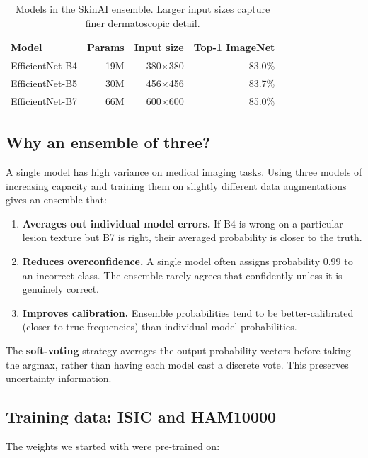 \documentclass[12pt,a4paper]{article}
\begin{document}
\begin{table}[h]
\centering
\begin{tabular}{lrrr}
\toprule
\textbf{Model} & \textbf{Params} & \textbf{Input size} & \textbf{Top-1 ImageNet} \\
\midrule
EfficientNet-B4 & 19M  & 380×380 & 83.0\% \\
EfficientNet-B5 & 30M  & 456×456 & 83.7\% \\
EfficientNet-B7 & 66M  & 600×600 & 85.0\% \\
\bottomrule
\end{tabular}
\caption{Models in the SkinAI ensemble. Larger input sizes capture finer dermatoscopic detail.}
\end{table}

\subsection{Why an ensemble of three?}

A single model has high variance on medical imaging tasks. Using three models of increasing
capacity and training them on slightly different data augmentations gives an ensemble that:

\begin{enumerate}
  \item \textbf{Averages out individual model errors.} If B4 is wrong on a particular lesion
    texture but B7 is right, their averaged probability is closer to the truth.
  \item \textbf{Reduces overconfidence.} A single model often assigns probability 0.99 to an
    incorrect class. The ensemble rarely agrees that confidently unless it is genuinely correct.
  \item \textbf{Improves calibration.} Ensemble probabilities tend to be better-calibrated
    (closer to true frequencies) than individual model probabilities.
\end{enumerate}

The \textbf{soft-voting} strategy averages the output probability vectors before taking the
argmax, rather than having each model cast a discrete vote. This preserves uncertainty information.

\subsection{Training data: ISIC and HAM10000}

The weights we started with were pre-trained on:
\end{document}
